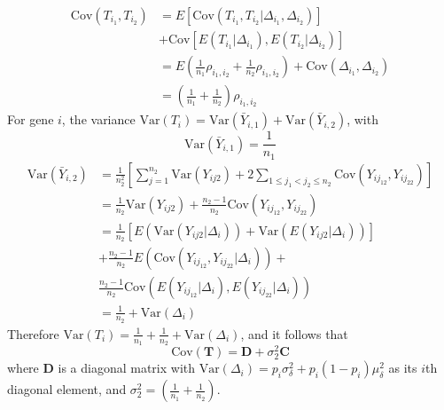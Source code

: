 \documentclass[useAMS,usenatbib, galley]{biom}
\begin{document}
	\begin{equation}
	\begin{aligned}
	\text{Cov}(T_{i_1}, T_{i_2}) & = E\left[\text{Cov}(T_{i_1}, T_{i_2}|\Delta_{i_1}, \Delta_{i_2}) \right] \\
	&  + \text{Cov}\left[E(T_{i_1}|\Delta_{i_1}), E(T_{i_2}|\Delta_{i_2})\right] \\
	& = E\left(\frac{1}{n_1}\rho_{i_1,i_2} + \frac{1}{n_2}\rho_{i_1,i_2}\right) + \text{Cov}(\Delta_{i_1}, \Delta_{i_2})\\
	& = \left(\frac{1}{n_1} + \frac{1}{n_2}\right)\rho_{i_1,i_2}
	\end{aligned}
	\end{equation}
	For gene $i$, the variance $\text{Var}(T_i) = \text{Var}(\bar{Y}_{i, 1}) + \text{Var}(\bar{Y}_{i, 2})$, with
	\[\text{Var}(\bar{Y}_{i, 1}) = \frac{1}{n_1}\] 
	\begin{equation}
	\begin{aligned}
	\text{Var}(\bar{Y}_{i, 2}) & = \frac{1}{n_2^2}\left[\sum_{j=1}^{n_2}\text{Var}(Y_{ij2}) + 2\sum_{1\leq j_1<j_2 \leq n_2} \text{Cov}(Y_{ij_12}, Y_{ij_22})\right] \\
	& = \frac{1}{n_2}\text{Var}(Y_{ij2}) + \frac{n_2-1}{n_2} \text{Cov}(Y_{ij_12}, Y_{ij_22})\\
	& = \frac{1}{n_2}\left[E\left(\text{Var}(Y_{ij2}|\Delta_i)\right) + \text{Var}\left(E(Y_{ij2}|\Delta_i)\right)\right] \\ \text{~~~} &+\frac{n_2-1}{n_2}E\left(\text{Cov}(Y_{ij_12}, Y_{ij_22}|\Delta_i)\right) +\\ &\frac{n_2-1}{n_2}\text{Cov}\left(E(Y_{ij_12}|\Delta_i), E(Y_{ij_22}|\Delta_i)\right) \\
	& = \frac{1}{n_2} + \text{Var}(\Delta_i)
	\end{aligned}
	\end{equation}
	Therefore $\text{Var}(T_i)  = \frac{1}{n_1} + \frac{1}{n_2} + \text{Var}(\Delta_i)$, and it follows that
	\begin{equation}\label{eq:tvar}
	\text{Cov}(\bm T) =  \bm D + \sigma_2^2\bm C 
	\end{equation}
	where $\bm D$ is a diagonal matrix with $\text{Var}(\Delta_i) =p_i\sigma_{\delta}^2 + p_i(1-p_i)\mu_{\delta}^2$ as its $i$th diagonal element, and $\sigma_2^2 = \left(\frac{1}{n_1} + \frac{1}{n_2}\right)$.
	
	
	
	
	
	
	\newpage
	
	
\end{document}
